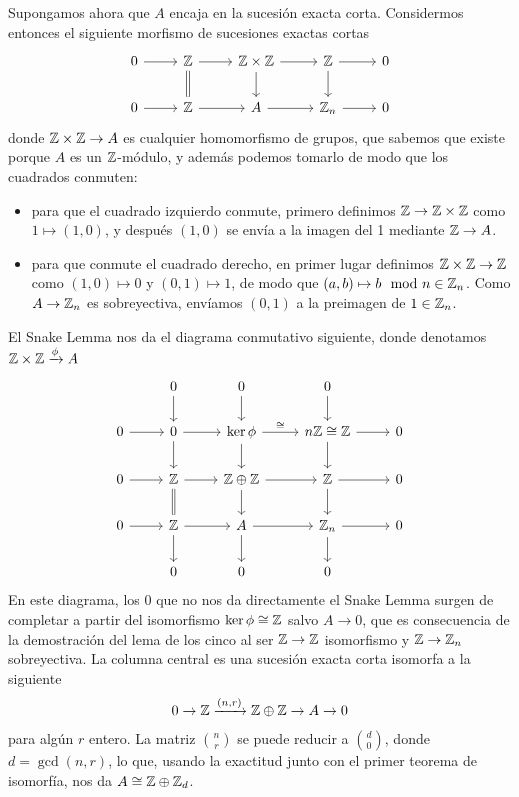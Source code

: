 \documentclass[twoside]{article}
\begin{document}
\begin{solucion}
    
Supongamos ahora que $A$ encaja en la sucesión exacta corta. Considermos entonces el siguiente morfismo de sucesiones exactas cortas
\[
\begin{tikzcd}
0\arrow[r] & \Z\arrow[r]\arrow[d, equals] &\Z\times\Z\arrow[r]\arrow[d] & \Z\arrow[r]\arrow[d] & 0\\
0\arrow[r] &  \Z\arrow[r] & A \arrow[r] & \Z_n\arrow[r] & 0
\end{tikzcd}
\]
donde $\mathbb{Z}\times\mathbb{Z}\to A$ es cualquier homomorfismo de grupos, que sabemos que existe porque $A$ es un $\mathbb{Z}$-módulo, y además podemos tomarlo de modo que los cuadrados conmuten: 
\begin{itemize}
\item para que el cuadrado izquierdo conmute, primero definimos $\mathbb{Z}\to\mathbb{Z}\times\mathbb{Z}$ como $1\mapsto (1,0)$, y después $(1,0)$ se envía a la imagen del 1 mediante $\mathbb{Z}\to A$.
\item para que conmute el cuadrado derecho, en primer lugar definimos $\mathbb{Z}\times\mathbb{Z}\to\mathbb{Z}$ como $(1,0)\mapsto 0$ y $(0,1)\mapsto 1$, de modo que $(a,b)\mapsto b\mod n\in\mathbb{Z}_n$. Como $A\to\mathbb{Z}_n$ es sobreyectiva, envíamos $(0,1)$ a la preimagen de $1\in\mathbb{Z}_n$.  
\end{itemize}
 El Snake Lemma nos da el diagrama conmutativo siguiente, donde denotamos $\mathbb{Z}\times\mathbb{Z}\xrightarrow{\phi} A$
\[
\begin{tikzcd}
            & 0\arrow[d] & 0\arrow[d]                  & 0\arrow[d] &\\
 0\arrow[r] & 0\arrow[r]\arrow[d] & \ker\phi\arrow[d] \arrow[r, "\cong"] & n\Z\cong\Z\arrow[r]\arrow[d] & 0\\
 0\arrow[r] & \Z\arrow[r]\arrow[d, equals] & \Z\oplus\Z \arrow[r]\arrow[d] & \Z \arrow[r]\arrow[d] & 0\\
 0\arrow[r] & \Z\arrow[r]\arrow[d] & A\arrow[r]\arrow[d] & \Z_n\arrow[r]\arrow[d] & 0\\
            &       0     &        0   &   0
\end{tikzcd}
\]
En este diagrama, los 0 que no nos da directamente el Snake Lemma surgen de completar a partir del isomorfismo $\ker\phi\cong\mathbb{Z}$ salvo $A\to 0$, que es consecuencia de la demostración del lema de los cinco al ser $\mathbb{Z}\to\mathbb{Z}$ isomorfismo y $\mathbb{Z}\to\mathbb{Z}_n$ sobreyectiva. La columna central es una sucesión exacta corta isomorfa a la siguiente
\[
0\to \mathbb{Z}\xrightarrow{(n,r)}\mathbb{Z}\oplus\mathbb{Z}\to A\to 0
\]
para algún $r$ entero. La matriz $\binom{n}{r}$ se puede reducir a $\binom{d}{0}$, donde $d=\gcd(n,r)$, lo que, usando la exactitud junto con el primer teorema de isomorfía, nos da $A\cong \mathbb{Z}\oplus\mathbb{Z}_d$.
\end{solucion}
\end{document}
